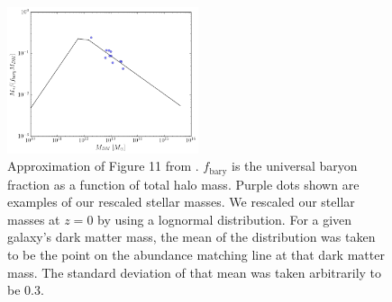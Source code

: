 \documentclass[fleqn,usenatbib,useAMS]{mnras}
\begin{document}
\begin{figure}
\includegraphics[width=0.5\textwidth]{plots/stellar_to_halo_ratio.png}
\caption{Approximation of Figure 11 from \citet{2018AstL...44....8K}.  $f_\mathrm{bary}$ is the universal baryon fraction as a function of total halo mass.  Purple dots shown are examples of our rescaled stellar masses.  We rescaled our stellar masses at $z=0$ by using a lognormal distribution.  For a given galaxy's dark matter mass, the mean of the distribution was taken to be the point on the abundance matching line at that dark matter mass.  The standard deviation of that mean was taken arbitrarily to be 0.3.}
\label{fig:stellar1}
\end{figure}
\end{document}
